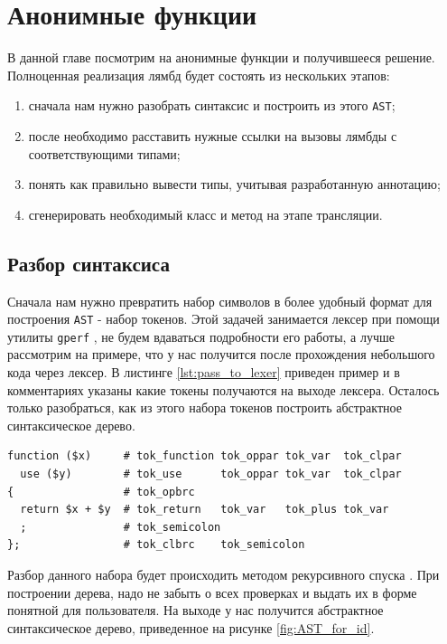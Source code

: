 \section{Анонимные функции}
В данной главе посмотрим на анонимные функции и получившееся решение.
Полноценная реализация лямбд будет состоять из нескольких этапов:
\begin{enumerate}
  \item сначала нам нужно разобрать синтаксис и построить из этого \verb|AST|;
  \item после необходимо расставить нужные ссылки на вызовы лямбды с соответствующими типами;
  \item понять как правильно вывести типы, учитывая разработанную аннотацию;
  \item сгенерировать необходимый класс и метод на этапе трансляции.
\end{enumerate}

\subsection{Разбор синтаксиса}
Сначала нам нужно превратить набор символов в более удобный формат для построения \verb|AST| - набор токенов.
Этой задачей занимается лексер при помощи утилиты \verb|gperf| \cite[с.~461]{cpp_gems_gperf}, не будем вдаваться подробности его работы, а лучше рассмотрим на примере, что у нас получится после прохождения небольшого кода через лексер.
В листинге \ref{lst:pass_to_lexer} приведен пример и в комментариях указаны какие токены получаются на выходе лексера.
Осталось только разобраться, как из этого набора токенов построить абстрактное синтаксическое дерево.

\begin{lstlisting}[caption={Результат работы лексера},label={lst:pass_to_lexer}]
function ($x)     # tok_function tok_oppar tok_var  tok_clpar
  use ($y)        # tok_use      tok_oppar tok_var  tok_clpar
{                 # tok_opbrc
  return $x + $y  # tok_return   tok_var   tok_plus tok_var
  ;               # tok_semicolon
};                # tok_clbrc    tok_semicolon
\end{lstlisting}

Разбор данного набора будет происходить методом рекурсивного спуска \cite{recursive_descent_parser}.
При построении дерева, надо не забыть о всех проверках и выдать их в форме понятной для пользователя.
На выходе у нас получится абстрактное синтаксическое дерево, приведенное на рисунке \ref{fig:AST_for_id}.

